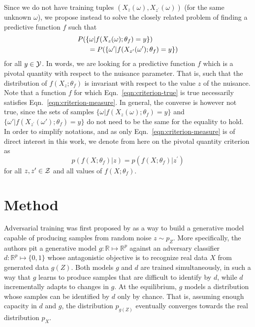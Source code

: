 \documentclass[twocolumn,superscriptaddress,aps]{revtex4-1}
\theoremstyle{plain}
\begin{document}
Since we do not have training tuples $(X_{z}(\omega),
X_{z^\prime}(\omega))$ (for the same unknown $\omega$), we propose instead to
solve the closely related problem of finding a predictive function $f$ such that
\begin{align}\label{eqn:criterion-measure}
    &P(\{ \omega | f(X_{z}(\omega) ; \theta_f) = y \} ) \nonumber \\
    &\indent = P( \{ \omega' | f(X_{z^\prime}(\omega') ; \theta_f) = y\})
\end{align}
for all $y \in {\cal Y}$. In words, we are looking for a predictive function $f$
which is a pivotal quantity \citep{degroot1986probability} with respect to the
nuisance parameter. That is, such that  the distribution of $f(X_z; \theta_f)$
is invariant with respect to the value $z$ of the nuisance. Note that a function
$f$ for which Eqn.~\ref{eqn:criterion-true} is true necessarily satisfies
Eqn.~\ref{eqn:criterion-measure}. In general, the converse is however not true,
since the sets of samples $\{ \omega | f(X_{z}(\omega); \theta_f) = y \}$ and $\{
\omega' | f(X_{z^\prime}(\omega'); \theta_f) = y \}$ do not need to be the same
for the equality to hold. In order to simplify notations, and as only
Eqn.~\ref{eqn:criterion-measure} is of direct interest in this work, we denote
from here on the pivotal quantity criterion as
\begin{equation}\label{eqn:criterion}
    p(f(X ; \theta_f) | z ) = p(f(X ; \theta_f) | z^\prime )
\end{equation}
for all $z,z^\prime \in  {\cal Z}$ and all values of $f(X ; \theta_f)$.



\section{Method}
\label{sec:method}

Adversarial training was first proposed by \citep{goodfellow2014generative} as a
way to build a generative model capable of producing samples from random noise
$z \sim p_Z$. More specifically, the authors pit a generative model $g:
\mathbb{R} \mapsto \mathbb{R}^p$ against an adversary classifier $d :
\mathbb{R}^p \mapsto \{ 0, 1\}$ whose antagonistic objective is to recognize
real data $X$ from generated data $g(Z)$. Both models $g$ and $d$ are trained
simultaneously, in such a way that $g$ learns to produce samples that are
difficult to identify by $d$, while $d$ incrementally adapts to changes in $g$.
At the equilibrium, $g$ models a distribution whose samples can be identified by
$d$ only by chance. That is, assuming enough capacity in $d$ and  $g$, the
distribution $p_{g(Z)}$ eventually converges towards the real distribution
$p_X$.
\end{document}
